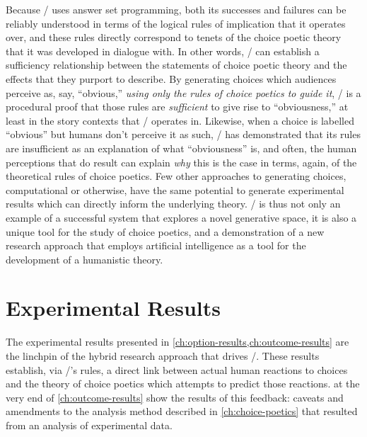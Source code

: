Because \dunyazad/ uses answer set programming, both its successes and failures can be reliably understood in terms of the logical rules of implication that it operates over, and these rules directly correspond to tenets of the choice poetic theory that it was developed in dialogue with.
%
In other words, \dunyazad/ can establish a sufficiency relationship between the statements of choice poetic theory and the effects that they purport to describe.
%
By generating choices which audiences perceive as, say, ``obvious,'' \emph{using only the rules of choice poetics to guide it}, \dunyazad/ is a procedural proof that those rules are \emph{sufficient} to give rise to ``obviousness,'' at least in the story contexts that \dunyazad/ operates in.
%
Likewise, when a choice is labelled ``obvious'' but humans don't perceive it as such, \dunyazad/ has demonstrated that its rules are insufficient as an explanation of what ``obviousness'' is, and often, the human perceptions that do result can explain \emph{why} this is the case in terms, again, of the theoretical rules of choice poetics.
%
Few other approaches to generating choices, computational or otherwise, have the same potential to generate experimental results which can directly inform the underlying theory.
%
\dunyazad/ is thus not only an example of a successful system that explores a novel generative space, it is also a unique tool for the study of choice poetics, and a demonstration of a new research approach that employs artificial intelligence as a tool for the development of a humanistic theory.


\section{Experimental Results}

The experimental results presented in \cref{ch:option-results,ch:outcome-results} are the linchpin of the hybrid research approach that drives \dunyazad/.
%
These results establish, via \dunyazad/'s rules, a direct link between actual human reactions to choices and the theory of choice poetics which attempts to predict those reactions.
%
 at the very end of \cref{ch:outcome-results} show the results of this feedback: caveats and amendments to the analysis method described in \cref{ch:choice-poetics} that resulted from an analysis of experimental data.


